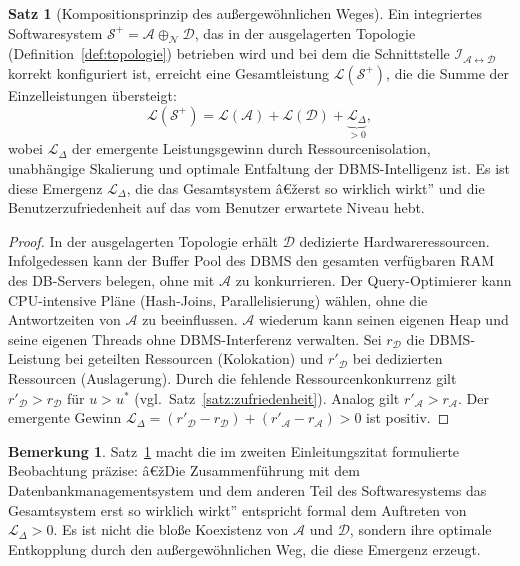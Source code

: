 ﻿\documentclass[a4paper,12pt]{article}
\theoremstyle{definition}
\newtheorem{satz}{Satz}
\newtheorem{bemerkung}{Bemerkung}
\begin{document}
\begin{satz}[Kompositionsprinzip des außergewöhnlichen Weges]
\label{satz:komposition}
Ein integriertes Softwaresystem $\mathcal{S}^+ = \mathcal{A} \oplus_{\mathcal{N}} \mathcal{D}$, das in der ausgelagerten Topologie (Definition~\ref{def:topologie}) betrieben wird und bei dem die Schnittstelle $\mathcal{I}_{\mathcal{A} \leftrightarrow \mathcal{D}}$ korrekt konfiguriert ist, erreicht eine Gesamtleistung $\mathcal{L}(\mathcal{S}^+)$, die die Summe der Einzelleistungen übersteigt:
\[
\mathcal{L}(\mathcal{S}^+) = \mathcal{L}(\mathcal{A}) + \mathcal{L}(\mathcal{D}) + \underbrace{\mathcal{L}_\Delta}_{> 0},
\]
wobei $\mathcal{L}_\Delta$ der emergente Leistungsgewinn durch Ressourcenisolation, unabhängige Skalierung und optimale Entfaltung der DBMS-Intelligenz ist. Es ist diese Emergenz $\mathcal{L}_\Delta$, die das Gesamtsystem â€žerst so wirklich wirkt'' und die Benutzerzufriedenheit auf das vom Benutzer erwartete Niveau hebt.
\end{satz}

\begin{proof}
In der ausgelagerten Topologie erhält $\mathcal{D}$ dedizierte Hardwareressourcen. Infolgedessen kann der Buffer Pool des DBMS den gesamten verfügbaren RAM des DB-Servers belegen, ohne mit $\mathcal{A}$ zu konkurrieren. Der Query-Optimierer kann CPU-intensive Pläne (Hash-Joins, Parallelisierung) wählen, ohne die Antwortzeiten von $\mathcal{A}$ zu beeinflussen. $\mathcal{A}$ wiederum kann seinen eigenen Heap und seine eigenen Threads ohne DBMS-Interferenz verwalten. Sei $r_\mathcal{D}$ die DBMS-Leistung bei geteilten Ressourcen (Kolokation) und $r'_\mathcal{D}$ bei dedizierten Ressourcen (Auslagerung). Durch die fehlende Ressourcenkonkurrenz gilt $r'_\mathcal{D} > r_\mathcal{D}$ für $u > u^*$ (vgl.\ Satz~\ref{satz:zufriedenheit}). Analog gilt $r'_\mathcal{A} > r_\mathcal{A}$. Der emergente Gewinn $\mathcal{L}_\Delta = (r'_\mathcal{D} - r_\mathcal{D}) + (r'_\mathcal{A} - r_\mathcal{A}) > 0$ ist positiv.
\end{proof}

\begin{bemerkung}
Satz~\ref{satz:komposition} macht die im zweiten Einleitungszitat formulierte Beobachtung präzise: â€žDie Zusammenführung mit dem Datenbankmanagementsystem und dem anderen Teil des Softwaresystems das Gesamtsystem erst so wirklich wirkt'' entspricht formal dem Auftreten von $\mathcal{L}_\Delta > 0$. Es ist nicht die bloße Koexistenz von $\mathcal{A}$ und $\mathcal{D}$, sondern ihre optimale Entkopplung durch den außergewöhnlichen Weg, die diese Emergenz erzeugt.
\end{bemerkung}
\end{document}
